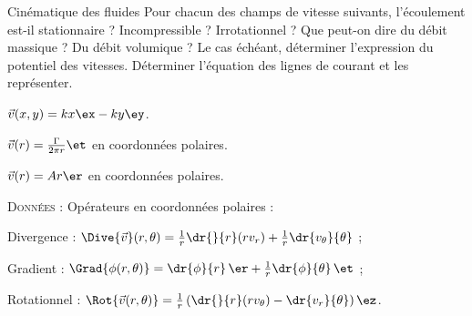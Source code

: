
\begin{exo}[PC][1][devoir]{Cinématique des fluides}
	Pour chacun des champs de vitesse suivants, l'écoulement est-il stationnaire ? Incompressible ? Irrotationnel ? Que peut-on dire du débit massique ? Du débit volumique ? Le cas échéant, déterminer l'expression du potentiel des vitesses. Déterminer l'équation des lignes de courant et les représenter.
	\begin{quest}
		\item $\Vec{v}(x,y) = kx \ex - ky \ey$.
		\item $\Vec{v}(r) = \frac{\Gamma}{2\pi r} \et$ en coordonnées polaires.
		\item $\Vec{v}(r) = A r \er$ en coordonnées polaires.
	\end{quest}
\vspace{0.5cm}
\textsc{Données :} Opérateurs en coordonnées polaires :
\begin{liste}
  \item Divergence  :  $\Dive{\Vec{v}}(r,\theta) = \frac{1}{r}\dr{}{r}(rv_r) + \frac{1}{r}\dr{v_\theta}{\theta}$ ;
  \item Gradient  :  $\Grad{\phi(r,\theta)} = \dr{\phi}{r} \, \er + \frac{1}{r}\dr{\phi}{\theta} \, \et$ ;
  \item Rotationnel :  $\Rot{\Vec{v}(r,\theta)} = \frac{1}{r}\left(\dr{}{r}(rv_\theta)-\dr{v_r}{\theta}\right) \ez$.
\end{liste}
\end{exo}

